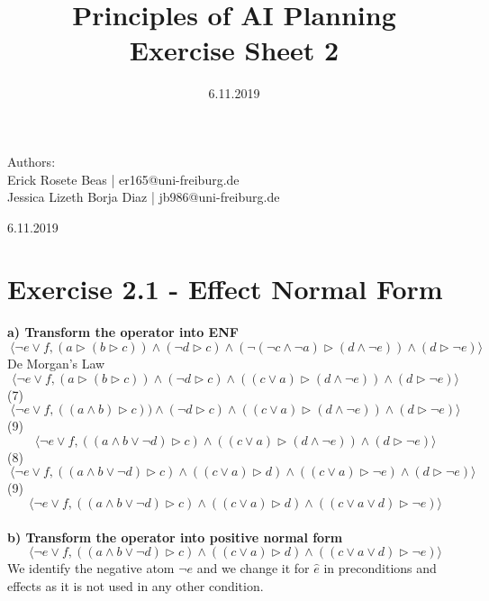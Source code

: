 \documentclass[12pt,a4paper]{article}
\title{\textbf{Principles of AI Planning
		\\{\Large Exercise Sheet 2}}}
\date{6.11.2019}
\begin{document}
	\begin{flushleft}
		Authors:\\
		Erick Rosete Beas | er165@uni-freiburg.de\\
		Jessica Lizeth Borja Diaz | jb986@uni-freiburg.de\\
	\end{flushleft}
	{\let\newpage\relax\maketitle}
	\begin{center} 
		\large 6.11.2019 
	\end{center}

	\section*{Exercise 2.1 - Effect Normal Form}
	\textbf{a) Transform the operator into ENF}\\
	\[\ \langle\neg e \lor f, (a \triangleright (b \triangleright c))  \land (\neg d \triangleright c) \land (\neg(\neg c \land \neg a) \triangleright (d \land \neg e)) \land (d \triangleright \neg e) \rangle \]	
	De Morgan's Law
	\[\ \langle\neg e \lor f, (a \triangleright (b \triangleright c))  \land (\neg d \triangleright c) \land ((c \lor a) \triangleright (d \land \neg e)) \land (d \triangleright \neg e) \rangle \]
	(7)
	\[\ \langle\neg e \lor f, ((a \land b) \triangleright c))  \land (\neg d \triangleright c) \land ((c \lor a) \triangleright (d \land \neg e)) \land (d \triangleright \neg e) \rangle \]
	(9)
	\[\ \langle\neg e \lor f, ((a \land b \lor \neg d) \triangleright c) \land ((c \lor a) \triangleright (d \land \neg e)) \land (d \triangleright \neg e) \rangle \]
	(8)
	\[\ \langle\neg e \lor f, ((a \land b \lor \neg d) \triangleright c) \land ((c \lor a) \triangleright d) \land ((c \lor a) \triangleright \neg e) \land (d \triangleright \neg e) \rangle \]
	(9)
	\[\ \langle\neg e \lor f, ((a \land b \lor \neg d) \triangleright c) \land ((c \lor a) \triangleright d) \land ((c \lor a \lor d) \triangleright \neg e) \rangle \]\\
	\textbf{b) Transform the operator into positive normal form}\\
	\[\ \langle\neg e \lor f, ((a \land b \lor \neg d) \triangleright c) \land ((c \lor a) \triangleright d) \land ((c \lor a \lor d) \triangleright \neg e) \rangle \]
	We identify the negative atom $\neg e$ and we change it for $\hat{e}$ in preconditions and effects as it is not used in any other condition.
\end{document}
